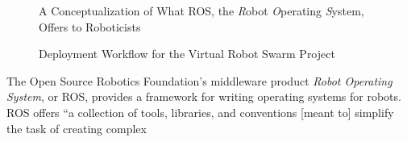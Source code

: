 \documentclass[9pt,twocolumn,twoside]{../../styles/osajnl}
\begin{document}
\begin{figure}[htbp]
\centering
{}
\caption{A Conceptualization of What ROS, the \textit{R}obot \textit{O}perating \textit{S}ystem, Offers to Roboticists \cite{www-ros-ros-is}}
\label{fig:rosOverview}
\end{figure}

\begin{figure}[htbp]
\centering
{}
\caption{Deployment Workflow for the Virtual Robot Swarm Project}
\label{fig:deployWorkflow}
\end{figure}

The Open Source Robotics Foundation's middleware product \textit{Robot Operating System}, or ROS, provides a framework for writing operating systems for robots.  ROS offers ``a collection of tools, libraries, and conventions [meant to] simplify the task of creating complex 
\end{document}
